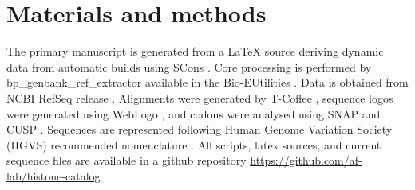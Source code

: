 \section{Materials and methods}
\label{sec:matmethods}

  The primary manuscript is generated from a \LaTeX{} source
  deriving dynamic data from automatic builds using SCons  \citep{SCons2005}.
  Core processing is performed by bp\_genbank\_ref\_extractor
  available in the Bio-EUtilities  \citep{bioperl}.
  Data is obtained from NCBI RefSeq release  \citep{PruittRefseq2014}.
  Alignments were generated by T-Coffee 
   \citep{tcoffee2000},
  sequence logos were generated using WebLogo 
   \citep{weblogo},
  and codons were analysed using SNAP  \citep{KorberSNAP2000}
  and CUSP  \citep{Emboss2000}.
  Sequences are represented following Human Genome Variation
  Society (HGVS) recommended nomenclature \citep{mutnomenclature2003}.
  All scripts, latex sources, and current sequence files
  are available in a github repository \url{https://github.com/af-lab/histone-catalog}
